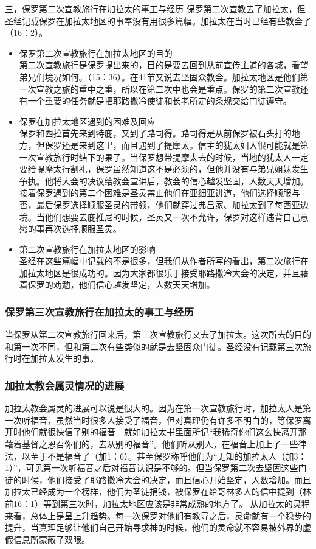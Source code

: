 三，保罗第二次宣教旅行在加拉太的事工与经历
保罗第二次宣教去了加拉太，但圣经记载保罗在加拉太地区的事奉没有用很多篇幅。加拉太在当时已经有些教会了（16：2）。
\begin{itemize} 
\itemsep-.5em 
\item 保罗第二次宣教旅行在加拉太地区的目的\\
第二次宣教旅行是保罗提出来的，目的是要去回到从前宣传主道的各城，看望弟兄们境况如何。（15：36）。在41节又说去坚固众教会。加拉太地区是他们第一次宣教之旅的重中之重，所以在第二次中也会是重点。保罗的第二次宣教还有一个重要的任务就是把耶路撒冷使徒和长老所定的条规交给门徒遵守。
\item 保罗在加拉太地区遇到的困难及回应\\
保罗和西拉首先来到特庇，又到了路司得。路司得是从前保罗被石头打的地方，但保罗还是来到这里，而且遇到了提摩太。信主的犹太妇人很可能就是第一次宣教旅行时结下的果子。当保罗想带提摩太去的时候，当地的犹太人一定要给提摩太行割礼，保罗虽然知道这不是必须的，但他并没有与弟兄姐妹发生争执。他将大会的决议给教会宣讲后，教会的信心越发坚固，人数天天增加。接着保罗遇到的第二个困难是圣灵禁止他们在亚细亚讲道，他们选择顺服与否，最后保罗选择顺服圣灵的带领，他们就穿过弗吕家、加拉太到了每西亚边境。当他们想要去庇推尼的时候，圣灵又一次不允许，保罗对这样违背自己意愿的事再次选择顺服圣灵。
\item 第二次宣教旅行在加拉太地区的影响\\
圣经在这些篇幅中记载的不是很多，但我们从作者所写的看出，第二次旅行在加拉太地区是很成功的。因为大家都很乐于接受耶路撒冷大会的决定，并且藉着保罗的劝勉，他们信心越发坚定，人数天天增加。
\end{itemize}

\subsubsection{保罗第三次宣教旅行在加拉太的事工与经历}
当保罗从第二次宣教旅行回来后，第三次宣教旅行又去了加拉太。这次所去的目的和第一次不同，但和第二次有些类似的就是去坚固众门徒。圣经没有记载第三次旅行时在加拉太发生的事。
\subsubsection{加拉太教会属灵情况的进展}
加拉太教会属灵的进展可以说是很大的。因为在第一次宣教旅行时，加拉太人是第一次听福音，虽然当时很多人接受了福音，但对真理仍有许多不明白的，等保罗离开时他们就很快信了别的福音—就如加拉太书里面所记“我稀奇你们这么快离开那藉着基督之恩召你们的，去从别的福音”。他们听从别人，在福音上加上了一些律法，以至于不是福音了（加1：6）。甚至保罗称呼他们为“无知的加拉太人（加3：1）”，可见第一次听福音之后对福音认识是不够的。但当保罗第二次去坚固这些门徒的时候，他们接受了耶路撒冷大会的决定，而且信心开始坚定，人数增加。而且加拉太已经成为一个榜样，他们为圣徒捐钱，被保罗在给哥林多人的信中提到（林前16：1）等到第三次时，加拉太地区应该是非常成熟的地方了。
从加拉太的灵程来看，总体上是呈上升趋势。每一次保罗对他们有教导之后，灵命就有一个稳步的提升，当真理足够让他们自己开始寻求神的时候，他们的灵命就不容易被外界的虚假信息所蒙蔽了双眼。







